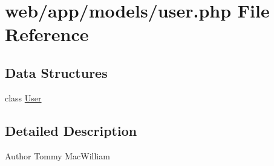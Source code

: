 \hypertarget{user_8php}{
\section{web/app/models/user.php File Reference}
\label{user_8php}
}
\subsection*{Data Structures}
\begin{DoxyCompactItemize}
\item 
class \hyperlink{class_user}{User}
\end{DoxyCompactItemize}


\subsection{Detailed Description}
\begin{DoxyAuthor}{Author}
Tommy MacWilliam 
\end{DoxyAuthor}
